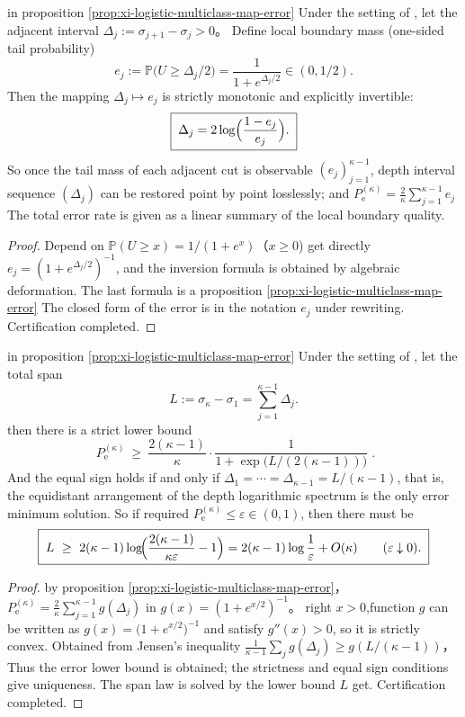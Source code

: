 \begin{corollary}\label{cor:xi-logistic-boundary-mass-inverts-spacing}
in proposition \ref{prop:xi-logistic-multiclass-map-error} Under the setting of , let the adjacent interval \(\Delta_j:=\sigma_{j+1}-\sigma_j>0\)。
Define local boundary mass (one-sided tail probability)
\[
e_j:=\mathbb P\bigl(U\ge \Delta_j/2\bigr)=\frac{1}{1+e^{\Delta_j/2}}\in(0,1/2).
\]
Then the mapping \(\Delta_j\mapsto e_j\) is strictly monotonic and explicitly invertible:
\[
\boxed{\;
\Delta_j=2\log\Bigl(\frac{1-e_j}{e_j}\Bigr).\;}
\]
So once the tail mass of each adjacent cut is observable \((e_j)_{j=1}^{\kappa-1}\), depth interval sequence \((\Delta_j)\) can be restored point by point losslessly; and
\(
P_{\mathrm e}^{(\kappa)}=\frac{2}{\kappa}\sum_{j=1}^{\kappa-1}e_j
\)
The total error rate is given as a linear summary of the local boundary quality.
\end{corollary}
\begin{proof}
Depend on \(\mathbb P(U\ge x)=1/(1+e^{x})\)（\(x\ge 0\)) get directly \(e_j=(1+e^{\Delta_j/2})^{-1}\), and the inversion formula is obtained by algebraic deformation.
The last formula is a proposition \ref{prop:xi-logistic-multiclass-map-error} The closed form of the error is in the notation \(e_j\) under rewriting. Certification completed.
\end{proof}

\begin{corollary}\label{cor:xi-logistic-optimal-spacing-span-law}
in proposition \ref{prop:xi-logistic-multiclass-map-error} Under the setting of , let the total span
\[
L:=\sigma_\kappa-\sigma_1=\sum_{j=1}^{\kappa-1}\Delta_j.
\]
then there is a strict lower bound
\[
\boxed{\;
P_{\mathrm e}^{(\kappa)}
\ \ge\
\frac{2(\kappa-1)}{\kappa}\cdot\frac{1}{1+\exp\!\bigl(L/(2(\kappa-1))\bigr)}\; }.
\]
And the equal sign holds if and only if
\(
\Delta_1=\cdots=\Delta_{\kappa-1}=L/(\kappa-1)
\), that is, the equidistant arrangement of the depth logarithmic spectrum is the only error minimum solution.
So if required \(P_{\mathrm e}^{(\kappa)}\le \varepsilon\in(0,1)\), then there must be
\[
\boxed{\;
L\ \ge\ 2(\kappa-1)\log\!\Bigl(\frac{2(\kappa-1)}{\kappa\varepsilon}-1\Bigr)
=2(\kappa-1)\log\frac{1}{\varepsilon}+O(\kappa)\qquad(\varepsilon\downarrow0).\;}
\]
\end{corollary}
\begin{proof}
by proposition \ref{prop:xi-logistic-multiclass-map-error}，
\(
P_{\mathrm e}^{(\kappa)}=\frac{2}{\kappa}\sum_{j=1}^{\kappa-1}g(\Delta_j)
\)
in \(g(x)=(1+e^{x/2})^{-1}\)。
right \(x>0\),function \(g\) can be written as \(g(x)=\bigl(1+e^{x/2}\bigr)^{-1}\) and satisfy \(g''(x)>0\), so it is strictly convex.
Obtained from Jensen's inequality
\(
\frac{1}{\kappa-1}\sum_{j}g(\Delta_j)\ge g(L/(\kappa-1))
\)，
Thus the error lower bound is obtained; the strictness and equal sign conditions give uniqueness.
The span law is solved by the lower bound \(L\) get. Certification completed.
\end{proof}


